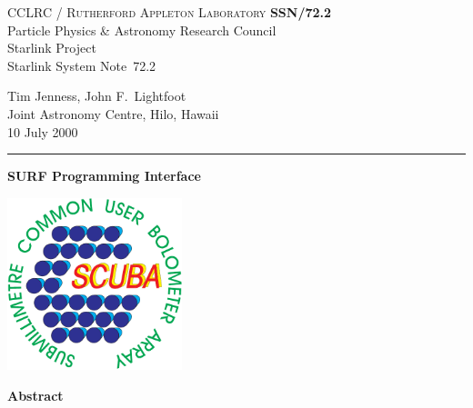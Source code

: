 \documentclass[twoside,11pt]{article}
\newcommand{\stardoccategory}  {Starlink System Note}
\newcommand{\stardocinitials}  {SSN}
\newcommand{\stardocnumber}    {72.2}
\newcommand{\stardocauthors}   {Tim Jenness, John F.\ Lightfoot\\
                                Joint Astronomy Centre, Hilo, Hawaii}
\newcommand{\stardocdate}      {10 July 2000}
\newcommand{\stardoctitle}     {SURF Programming Interface}
\newcommand{\stardocname}{\stardocinitials /\stardocnumber}
\newenvironment{latexonly}{}{}
\renewcommand{\_}{\texttt{\symbol{95}}}
\begin{document}
\thispagestyle{empty}

\begin{latexonly}
   CCLRC / \textsc{Rutherford Appleton Laboratory} \hfill \textbf{\stardocname}\\
   {\large Particle Physics \& Astronomy Research Council}\\
   {\large Starlink Project\\}
   {\large \stardoccategory\ \stardocnumber}
   \begin{flushright}
   \stardocauthors\\
   \stardocdate
   \end{flushright}
   \vspace{-4mm}
   \rule{\textwidth}{0.5mm}
   \vspace{5mm}
   \begin{center}
   {\Large\textbf{\stardoctitle}}
   \end{center}
   \vspace{5mm}

\begin{center}
\includegraphics[width=2.0in]{ssn72_logo}
\end{center}

   \vspace{10mm}
   \begin{center}
      {\Large\textbf{Abstract}}
   \end{center}
\end{latexonly}
\end{document}
